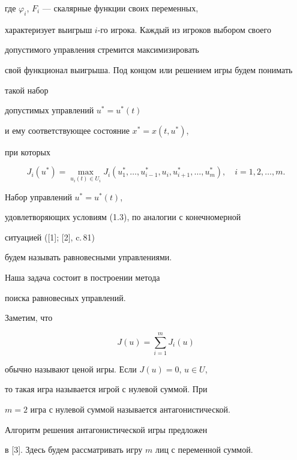 где $\varphi_{i}$, $F_{i}$ --- скалярные функции своих переменных, 


характеризует выигрыш $i$-го игрока. Каждый из игроков выбором своего


допустимого управления стремится максимизировать 


свой функционал выигрыша. Под концом или решением игры будем понимать


такой набор 


допустимых управлений $u^{\ast}=u^{\ast}(t)$


и ему соответствующее состояние $x^{\ast}=x(t,u^{\ast})$,


при которых


\begin{equation}


J_{i}(u^{\ast})=\max_{u_{i}(t)\in U_{i}}


J_{i}(u_{1}^{\ast},\dotsc,u_{i-1}^{\ast},


u_{i},u_{i+1}^{\ast},\dotsc,u_{m}^{\ast}),\quad i=1,2,\dotsc, m.


\end{equation}


Набор управлений $u^{\ast}=u^{\ast}(t)$,


удовлетворяющих условиям (1.3), по аналогии с конечномерной 


ситуацией ([1]; [2], c.\,81)


будем называть равновесными управлениями. 


Наша задача состоит в построении метода 


поиска равновесных управлений.





Заметим, что


\begin{equation}


J(u)=\sum_{i=1}^{m}J_{i}(u)


\end{equation}


обычно называют ценой игры. Если $J(u)=0$, $u\in U$,


то такая игра называется игрой с нулевой суммой. При 


$m=2$ игра с нулевой суммой называется антагонистической.


Алгоритм решения антагонистической игры предложен 


в [3]. Здесь будем рассматривать игру $m$ лиц с переменной суммой.





